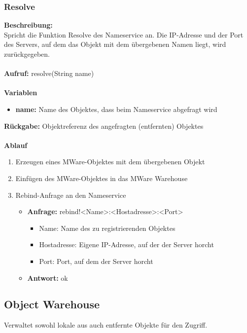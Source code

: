 \subsubsection{Resolve}
\textbf{Beschreibung:}\\
Spricht die Funktion Resolve des Nameservice an. Die IP-Adresse und der Port des Servers, auf dem das Objekt mit dem übergebenen Namen liegt, wird zurückgegeben. \\ \\
\textbf{Aufruf:} resolve(String name)\\ \\
\textbf{Variablen}
\begin{itemize}
\item \textbf{name:} Name des Objektes, dass beim Nameservice abgefragt wird
\end{itemize}
\textbf{Rückgabe:} Objektreferenz des angefragten (entfernten) Objektes\\ \\
\textbf{Ablauf}
\begin{enumerate}
\item Erzeugen eines MWare-Objektes mit dem übergebenen Objekt
\item Einfügen des MWare-Objektes in das MWare Warehouse
\item Rebind-Anfrage an den Nameservice
\begin{itemize}
\item \textbf{Anfrage:} rebind!<Name>:<Hostadresse>:<Port>
\begin{itemize}
\item Name: Name des zu registrierenden Objektes 
\item Hostadresse: Eigene IP-Adresse, auf der der Server horcht
\item Port: Port, auf dem der Server horcht
\end{itemize}
\item \textbf{Antwort:} ok
\end{itemize}
\end{enumerate}

\subsection{Object Warehouse}
Verwaltet sowohl lokale aus auch entfernte Objekte für den Zugriff.

